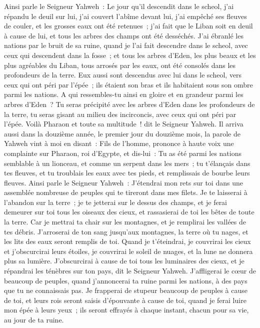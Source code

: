 \begin{multicols}{2}
Ainsi parle le Seigneur Yahweh~: Le jour qu'il descendit dans le scheol, j'ai répandu le deuil sur lui, j'ai couvert l'abîme devant lui, j'ai empêché ses fleuves de couler, et les grosses eaux ont été retenues~; j'ai fait que le Liban soit en deuil à cause de lui, et tous les arbres des champs ont été desséchés.
J'ai ébranlé les nations par le bruit de sa ruine, quand je l'ai fait descendre dans le scheol, avec ceux qui descendent dans la fosse~; et tous les arbres d'Eden, les plus beaux et les plus agréables du Liban, tous arrosés par les eaux, ont été consolés dans les profondeurs de la terre.
Eux aussi sont descendus avec lui dans le scheol, vers ceux qui ont péri par l'épée~; ils étaient son bras et ils habitaient sous son ombre parmi les nations.
A qui ressembles-tu ainsi en gloire et en grandeur parmi les arbres d'Eden~? Tu seras précipité avec les arbres d'Eden dans les profondeurs de la terre, tu seras gisant au milieu des incirconcis, avec ceux qui ont péri par l'épée. Voilà Pharaon et toute sa multitude~! dit le Seigneur Yahweh.
\VerseOne{}Il arriva aussi dans la douzième année, le premier jour du douzième mois, la parole de Yahweh vint à moi en disant~:
Fils de l'homme, prononce à haute voix une complainte sur Pharaon, roi d'Egypte, et dis-lui~: Tu as été parmi les nations semblable à un lionceau, et comme un serpent dans les mers~; tu t'élançais dans tes fleuves, et tu troublais les eaux avec tes pieds, et remplissais de bourbe leurs fleuves.
Ainsi parle le Seigneur Yahweh~: J'étendrai mon rets sur toi dans une assemblée nombreuse de peuples qui te tireront dans mes filets.
Je te laisserai à l'abandon sur la terre~; je te jetterai sur le dessus des champs, et je ferai demeurer sur toi tous les oiseaux des cieux, et rassasierai de toi les bêtes de toute la terre.
Car je mettrai ta chair sur les montagnes, et je remplirai les vallées de tes débris.
J'arroserai de ton sang jusqu'aux montagnes, la terre où tu nages, et les lits des eaux seront remplis de toi.
Quand je t'éteindrai, je couvrirai les cieux et j'obscurcirai leurs étoiles, je couvrirai le soleil de nuages, et la lune ne donnera plus sa lumière.
J'obscurcirai à cause de toi tous les luminaires des cieux, et je répandrai les ténèbres sur ton pays, dit le Seigneur Yahweh.
J'affligerai le cœur de beaucoup de peuples, quand j'annoncerai ta ruine parmi les nations, à des pays que tu ne connaissais pas.
Je frapperai de stupeur beaucoup de peuples à cause de toi, et leurs rois seront saisis d'épouvante à cause de toi, quand je ferai luire mon épée à leurs yeux~; ils seront effrayés à chaque instant, chacun pour sa vie, au jour de ta ruine.

\end{multicols}
